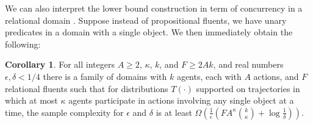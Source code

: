 \documentclass[letterpaper]{article} %
\theoremstyle{definition}
\newtheorem{theorem}{Theorem}
\newtheorem{corollary}[theorem]{Corollary}
\theoremstyle{remark}
\newcommand{\noop}{\textit{NO-OP}\xspace}
\newcommand{\mfmap}{\ac{MF-MAP}\xspace}
\begin{document}

We can also interpret the lower bound construction in term of concurrency in a relational domain \cite{crosby2014single}. Suppose instead of propositional fluents, we have unary predicates in a domain with a single object. We then immediately obtain the following:
\begin{corollary}
\label{corollary:conflicting-actions-complexity}
For all integers $A\geq 2$, $\kappa$, $k$, and $F\geq 2Ak$, and real numbers $\epsilon,\delta < 1/4$ there is a family of domains with $k$ agents, each with $A$ actions, and $F$ relational fluents such that for distributions $T(\cdot)$ supported on trajectories in which at most $\kappa$ agents participate in actions involving any single object at a time, the sample complexity for $\epsilon$ and $\delta$ is at least $\Omega\left(\frac{1}{\epsilon}(FA^{\kappa}{k\choose\kappa}+\log\frac{1}{\delta})\right)$.
\end{corollary}







\end{document}
